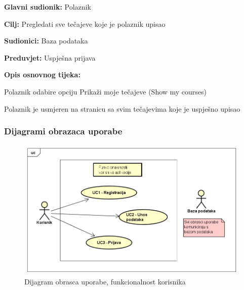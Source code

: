 			\noindent {}
			\begin{packed_item}
				
				\item \textbf{Glavni sudionik:} Polaznik
				\item  \textbf{Cilj:} Pregledati sve tečajeve koje je polaznik upisao
				\item  \textbf{Sudionici:} Baza podataka
				\item  \textbf{Preduvjet:} Uspješna prijava
				\item  \textbf{Opis osnovnog tijeka:}
				
				\item[] \begin{packed_enum}
					
					\item Polaznik odabire opciju Prikaži moje tečajeve (Show my courses)
					\item Polaznik je usmjeren na stranicu sa svim tečajevima koje je uspješno upisao
					
				\end{packed_enum}
				
				
			\end{packed_item}
			
			\eject
		
				\subsubsection{Dijagrami obrazaca uporabe}
					
					\begin{figure}[h]
						\includegraphics[scale=0.68]{dijagrami/UML_kor.PNG}
						\centering
						\caption{Dijagram obrasca uporabe, funkcionalnost korisnika}
						\label{fig:UML_kor}
					\end{figure}
				\eject
					
